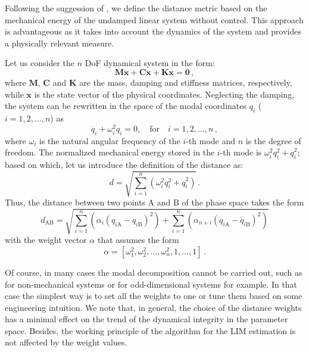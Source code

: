 \documentclass[preprint,12pt]{elsarticle}
\begin{document}
	Following the suggession of \cite{habib2021dynamical}, we define the distance metric based on the mechanical energy of the undamped linear system without control. This approach is advantageous as it takes into account the dynamics of the system and provides a physically relevant measure.
	
	Let us consider the $n$ DoF dynamical system in the form:
	\begin{equation}   \mathbf{M}\ddot{\mathbf{x}}+\mathbf{C}\dot{\mathbf{x}}+\mathbf{K}\mathbf{x}=\mathbf{0}\,,
	\end{equation}
	where $\mathbf{M}$, $\mathbf{C}$ and $\mathbf{K}$ are the mass, damping and stiffness matrices, respectively, while $\mathbf{x}$ is the state vector of the physical coordinates. 
	Neglecting the damping, the system can be rewritten in the space of the modal coordinates $q_i$ ($i = 1,2,\dots,n$) as
	\begin{equation}
	\ddot{q}_i+\omega^2_i q_i=0,\quad \mathrm{for}\quad i = 1,2,\dots,n\,,
	\end{equation}
	where $\omega_i$ is the natural angular frequency of the $i$-th mode and $n$ is the degree of freedom. The normalized mechanical energy stored in the $i$-th mode is $\omega_i^2 q_i^2+\dot{q}_i^2$; based on which, let us introduce the definition of the distance as:
	\begin{equation}\label{eq:distancedef}
	d=\sqrt{\sum_{i=1}^n(\omega_i^2 q_i^2+\dot{q}_i^2)}\,.
	\end{equation}
	Thus, the distance between two points $\mathrm{A}$ and $\mathrm{B}$ of the phase space takes the form
	\begin{equation}\label{eq:distance}
	d_\mathrm{AB}=\sqrt{\sum_{i=1}^n \left(\alpha_i(q_{i\mathrm{A}}-q_{i\mathrm{B}})^2\right) + \sum_{i=1}^n \left(\alpha_{n+i}(\dot{q}_{i\mathrm{A}}-\dot{q}_{i\mathrm{B}})^2\right)}
	\end{equation}
	with the weight vector $\alpha$ that assumes the form
	\begin{equation}\label{eq:distanceweights}
	\alpha = [\omega_1^2, \omega_2^2, \dots, \omega_n^2,1,\dots,1]\,.
	\end{equation}
	
	Of course, in many cases the modal decomposition cannot be carried out, such as for non-mechanical systems or for odd-dimensional systems for example. In that case the simplest way is to set all the weights to one or tune them based on some engineering intuition. We note that, in general, the choice of the distance weights has a minimal effect on the trend of the dynamical integrity in the parameter space. Besides, the working principle of the algorithm for the LIM estimation is not affected by the weight values.
	
\end{document}

